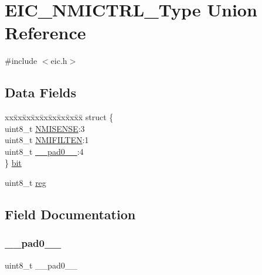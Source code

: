 \hypertarget{union_e_i_c___n_m_i_c_t_r_l___type}{}\section{E\+I\+C\+\_\+\+N\+M\+I\+C\+T\+R\+L\+\_\+\+Type Union Reference}
\label{union_e_i_c___n_m_i_c_t_r_l___type}


{\ttfamily \#include $<$eic.\+h$>$}

\subsection*{Data Fields}
\begin{DoxyCompactItemize}
\item 
\begin{tabbing}
xx\=xx\=xx\=xx\=xx\=xx\=xx\=xx\=xx\=\kill
struct \{\\
\>uint8\_t \mbox{\hyperlink{union_e_i_c___n_m_i_c_t_r_l___type_a0a2c6ace1f5336b3c57dbdf758221de1}{NMISENSE}}:3\\
\>uint8\_t \mbox{\hyperlink{union_e_i_c___n_m_i_c_t_r_l___type_a3a31c9d0dd91e203dfab1e11af4c55bb}{NMIFILTEN}}:1\\
\>uint8\_t \mbox{\hyperlink{union_e_i_c___n_m_i_c_t_r_l___type_a8b4eebe79ded0459acec2f4950102ba3}{\_\_pad0\_\_}}:4\\
\} \mbox{\hyperlink{union_e_i_c___n_m_i_c_t_r_l___type_a3d2f0ac51dea5c4bcdd9033def764133}{bit}}\\

\end{tabbing}\item 
uint8\+\_\+t \mbox{\hyperlink{union_e_i_c___n_m_i_c_t_r_l___type_a9428adc9af4653a2050e2536b55dec8d}{reg}}
\end{DoxyCompactItemize}


\subsection{Field Documentation}
\mbox{\label{union_e_i_c___n_m_i_c_t_r_l___type_a8b4eebe79ded0459acec2f4950102ba3}} 
\subsubsection{\texorpdfstring{\_\_pad0\_\_}{\_\_pad0\_\_}}
{\footnotesize\ttfamily uint8\+\_\+t \+\_\+\+\_\+pad0\+\_\+\+\_\+}


